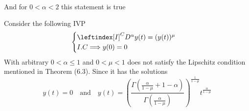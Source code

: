 \begin{example}
    And for $0< \alpha < 2$ this statement is true
\end{example}
\begin{example}
    Consider the following IVP
    \begin{equation}
        \begin{cases}
            \leftindex[I]^C {D^{\alpha}} y(t) = (y(t))^\mu
            \\
            I.C \Longrightarrow y(0) = 0
        \end{cases}
    \end{equation}
    With arbitrary $ 0< \alpha \leq 1$ and $ 0<\mu<1$ does not satisfy the Lipschitz condition mentioned
    in Theorem (6.3). Since it has the solutions
    \[
        y(t) = 0 \quad \text{and} \quad y(t) = \left( \frac{\Gamma\left(\frac{\alpha}{1-\mu}+1-\alpha\right)}{\Gamma\left(\frac{\alpha}{1-\mu}\right)}  \right)^{\frac{1}{1-\mu}} t^{\frac{\alpha}{1-\mu}}
    \]
\end{example}
